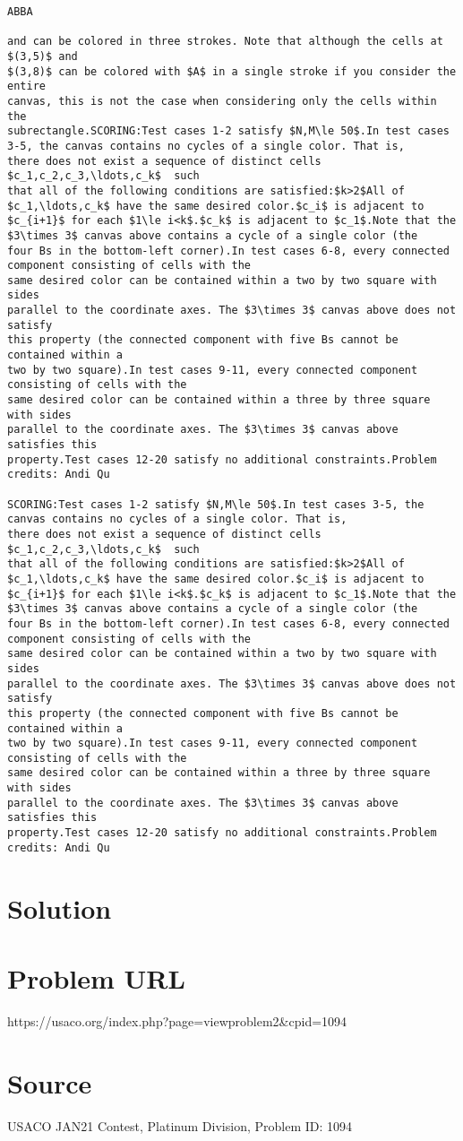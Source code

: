 \documentclass[12pt]{article}
\begin{document}
\begin{verbatim}
ABBA

and can be colored in three strokes. Note that although the cells at $(3,5)$ and
$(3,8)$ can be colored with $A$ in a single stroke if you consider the entire
canvas, this is not the case when considering only the cells within the
subrectangle.SCORING:Test cases 1-2 satisfy $N,M\le 50$.In test cases 3-5, the canvas contains no cycles of a single color. That is,
there does not exist a sequence of distinct cells $c_1,c_2,c_3,\ldots,c_k$  such
that all of the following conditions are satisfied:$k>2$All of $c_1,\ldots,c_k$ have the same desired color.$c_i$ is adjacent to $c_{i+1}$ for each $1\le i<k$.$c_k$ is adjacent to $c_1$.Note that the $3\times 3$ canvas above contains a cycle of a single color (the
four Bs in the bottom-left corner).In test cases 6-8, every connected component consisting of cells with the
same desired color can be contained within a two by two square with sides
parallel to the coordinate axes. The $3\times 3$ canvas above does not satisfy
this property (the connected component with five Bs cannot be contained within a
two by two square).In test cases 9-11, every connected component consisting of cells with the
same desired color can be contained within a three by three square with sides
parallel to the coordinate axes. The $3\times 3$ canvas above satisfies this
property.Test cases 12-20 satisfy no additional constraints.Problem credits: Andi Qu

SCORING:Test cases 1-2 satisfy $N,M\le 50$.In test cases 3-5, the canvas contains no cycles of a single color. That is,
there does not exist a sequence of distinct cells $c_1,c_2,c_3,\ldots,c_k$  such
that all of the following conditions are satisfied:$k>2$All of $c_1,\ldots,c_k$ have the same desired color.$c_i$ is adjacent to $c_{i+1}$ for each $1\le i<k$.$c_k$ is adjacent to $c_1$.Note that the $3\times 3$ canvas above contains a cycle of a single color (the
four Bs in the bottom-left corner).In test cases 6-8, every connected component consisting of cells with the
same desired color can be contained within a two by two square with sides
parallel to the coordinate axes. The $3\times 3$ canvas above does not satisfy
this property (the connected component with five Bs cannot be contained within a
two by two square).In test cases 9-11, every connected component consisting of cells with the
same desired color can be contained within a three by three square with sides
parallel to the coordinate axes. The $3\times 3$ canvas above satisfies this
property.Test cases 12-20 satisfy no additional constraints.Problem credits: Andi Qu
\end{verbatim}

\section*{Solution}


\section*{Problem URL}
https://usaco.org/index.php?page=viewproblem2&cpid=1094

\section*{Source}
USACO JAN21 Contest, Platinum Division, Problem ID: 1094
\end{document}
